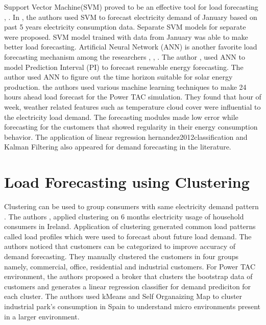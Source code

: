 Support Vector Machine(SVM) proved to be an effective tool for load forecasting \cite{sapankevych2009time}, \cite{chen2004load}. In \cite{chen2004load}, the authors used SVM to forecast electricity demand of January based on past 5 years electricity consumption data. Separate SVM models for separate were proposed. SVM model trained with data from January was able to make better load forecasting. Artificial Neural Network (ANN) is another favorite load forecasting mechanism among the researchers \cite{izgi2012short}, \cite{quan2014short}, \cite{hsu2003regional}. The author \cite{quan2014short}, used ANN to model Prediction Interval (PI) to forecast renewable energy forecasting.  The author \cite{izgi2012short} used ANN to figure out the time horizon suitable for solar energy production. \cite{parra2013initial} the authors used various machine learning techniques to make 24 hours ahead load forecast for the Power TAC simulation. They found that hour of week, weather related features such as temperature cloud cover were influential to the electricity load demand. The forecasting modules made low error while forecasting for the customers that showed regularity in their energy consumption behavior. The application of linear regression \cite{mcloughlin2015clustering} {hernandez2012classification} and Kalman Filtering \cite{al2004short} also appeared for demand forecasting in the literature. 

\section {Load Forecasting using Clustering}

Clustering can be used to group consumers with same electricity demand pattern \cite{hernandez2012classification}. The authors \cite{mcloughlin2015clustering}, applied clustering on 6 months electricity usage of household consumers in Ireland. Application of clustering generated common load patterns called load profiles which were used to forecast about future load demand. The authors \cite{cho1995customer} noticed that customers can be categorized to improve accuracy of demand forecasting. They manually clustered the customers in four groups namely, commercial, office, residential and industrial customers. For Power TAC environment, the authors \cite{wang2015gongbroker} proposed a broker that clusters the bootstrap data of customers and generates a linear regression classifier for demand prediciton for each cluster.  The authors \cite{hernandez2012classification} used kMeans and Self Organaizing Map to cluster industrial park's consumption in Spain to understand micro environments present in a larger environment.



